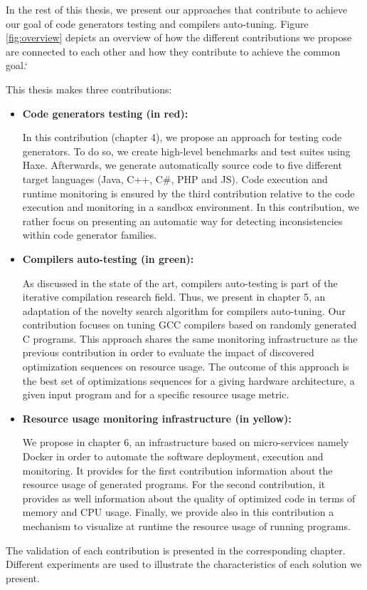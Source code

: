 

In the rest of this thesis, we present our approaches that contribute to achieve our goal of code generators testing and compilers auto-tuning. Figure \ref{fig:overview} depicts an overview of how the different contributions we propose are connected to each other and how they contribute to achieve the common goal.`



This thesis makes three contributions:
\begin{itemize}
	\item \textbf{Code generators testing (in red): }
	
	In this contribution (chapter 4), we propose an approach for testing code generators. To do so, we create high-level benchmarks and test suites using Haxe. Afterwards, we generate automatically source code to five different target languages (Java, C++, C\#, PHP and JS). Code execution and runtime monitoring is ensured by the third contribution relative to the code execution and monitoring in a sandbox environment. In this contribution, we rather focus  on presenting an automatic way for detecting inconsistencies within code generator families.
	
	\item \textbf{Compilers auto-testing (in green):}
	
	As discussed in the state of the art, compilers auto-testing is part of the iterative compilation research field. Thus, we present in chapter 5, an adaptation of the novelty search algorithm for compilers auto-tuning. Our contribution focuses on tuning GCC compilers based on randomly generated C programs.
	This approach shares the same monitoring infrastructure as the previous contribution in order to evaluate the impact of discovered optimization sequences on resource usage. The outcome of this approach is the best set of optimizations sequences for a giving hardware architecture, a given input program and for a specific resource usage metric. 
	
	\item \textbf{Resource usage monitoring infrastructure (in yellow):}
	
	We propose in chapter 6, an infrastructure based on micro-services namely Docker in order to automate the software deployment, execution and monitoring. It provides for the first contribution information about the resource usage of generated programs. For the second contribution, it provides as well information about the quality of optimized code in terms of memory and CPU usage. Finally, we provide also in this contribution a mechanism to visualize at runtime the resource usage of running programs.
\end{itemize}

The validation of each contribution is presented in the corresponding chapter. Different experiments are used to illustrate the characteristics of each solution we present.



